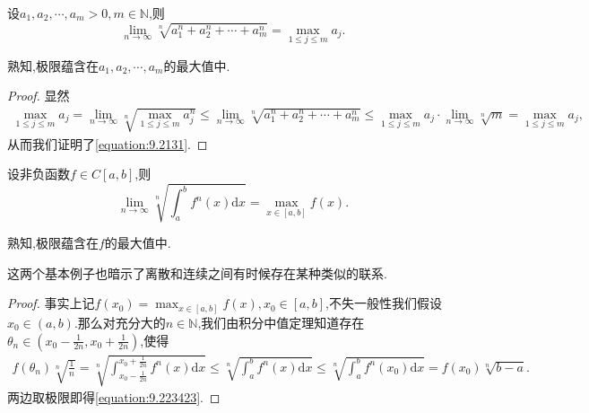 \documentclass[../../main.tex]{subfiles}
\begin{document}
\begin{example}
设\(a_1,a_2,\cdots,a_m > 0,m \in \mathbb{N}\),则
\[
\lim_{n \to \infty} \sqrt[n]{a_1^n + a_2^n + \cdots + a_m^n} = \max_{1\leqslant  j\leqslant  m} a_j.
\]
\end{example} 
\begin{remark}
熟知,极限蕴含在\(a_1,a_2,\cdots,a_m\)的最大值中.
\end{remark}
\begin{proof}
显然
\begin{align}\label{equation:9.2131}
\max_{1\leqslant  j\leqslant  m} a_j = \lim_{n \to \infty} \sqrt[n]{\max_{1\leqslant  j\leqslant  m} a_j^n} \leqslant  \lim_{n \to \infty} \sqrt[n]{a_1^n + a_2^n + \cdots + a_m^n} \leqslant  \max_{1\leqslant  j\leqslant  m} a_j \cdot \lim_{n \to \infty} \sqrt[n]{m} = \max_{1\leqslant  j\leqslant  m} a_j,
\end{align}
从而我们证明了\eqref{equation:9.2131}.  

\end{proof}

\begin{example}\label{example-3.31}
设非负函数\(f \in C[a,b]\),则
\[
\lim_{n \to \infty} \sqrt[n]{\int_{a}^{b} f^n(x)\mathrm{d}x} = \max_{x\in[a,b]} f(x).
\]
\end{example}
\begin{remark}
熟知,极限蕴含在\(f\)的最大值中. 
\end{remark}
\begin{note}
这两个基本例子也暗示了离散和连续之间有时候存在某种类似的联系.
\end{note}
\begin{proof}
事实上记\(f(x_0) = \max_{x\in[a,b]} f(x), x_0 \in [a,b]\),不失一般性我们假设\(x_0 \in (a,b)\).那么对充分大的\(n \in \mathbb{N}\),我们由积分中值定理知道存在\(\theta_n \in (x_0 - \frac{1}{2n}, x_0 + \frac{1}{2n})\),使得
\begin{align}\label{equation:9.223423}
f(\theta_n) \sqrt[n]{\frac{1}{n}} = \sqrt[n]{\int_{x_0 - \frac{1}{2n}}^{x_0 + \frac{1}{2n}} f^n(x)\mathrm{d}x} \leqslant  \sqrt[n]{\int_{a}^{b} f^n(x)\mathrm{d}x} \leqslant  \sqrt[n]{\int_{a}^{b} f^n(x_0)\mathrm{d}x} = f(x_0) \sqrt[n]{b - a}.   
\end{align}
两边取极限即得\eqref{equation:9.223423}.

\end{proof}
\end{document}
